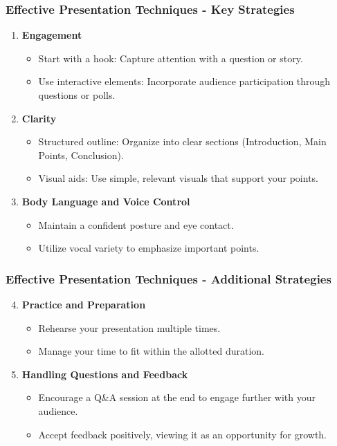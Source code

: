 \documentclass[aspectratio=169]{beamer}
\begin{document}
\begin{frame}[fragile]
    \frametitle{Effective Presentation Techniques - Key Strategies}
    \begin{enumerate}
        \item \textbf{Engagement}
        \begin{itemize}
            \item Start with a hook: Capture attention with a question or story.
            \item Use interactive elements: Incorporate audience participation through questions or polls.
        \end{itemize}
        
        \item \textbf{Clarity}
        \begin{itemize}
            \item Structured outline: Organize into clear sections (Introduction, Main Points, Conclusion).
            \item Visual aids: Use simple, relevant visuals that support your points.
        \end{itemize}
        
        \item \textbf{Body Language and Voice Control}
        \begin{itemize}
            \item Maintain a confident posture and eye contact.
            \item Utilize vocal variety to emphasize important points.
        \end{itemize}
    \end{enumerate}
\end{frame}

\begin{frame}[fragile]
    \frametitle{Effective Presentation Techniques - Additional Strategies}
    \begin{enumerate}
        \setcounter{enumi}{3}
        \item \textbf{Practice and Preparation}
        \begin{itemize}
            \item Rehearse your presentation multiple times.
            \item Manage your time to fit within the allotted duration.
        \end{itemize}
        
        \item \textbf{Handling Questions and Feedback}
        \begin{itemize}
            \item Encourage a Q\&A session at the end to engage further with your audience.
            \item Accept feedback positively, viewing it as an opportunity for growth.
        \end{itemize}
    \end{enumerate}
\end{frame}
\end{document}
